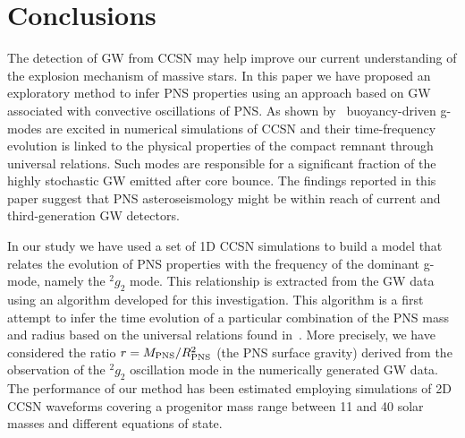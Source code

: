 \section{Conclusions}
\label{sec:conclusion}

The detection of GW from CCSN may help improve our current understanding of the explosion mechanism of massive stars.  
In this paper we have proposed an exploratory method to infer PNS properties using an approach based on GW associated with convective oscillations of PNS. As shown by~\cite{Torres:2019b} buoyancy-driven g-modes are excited in numerical simulations of CCSN and their time-frequency evolution is linked to the physical properties of the compact remnant through universal relations. Such modes are responsible for a significant fraction of the highly stochastic GW emitted after core bounce. The findings reported in this paper suggest that PNS asteroseismology might be within reach of current and third-generation GW detectors.

In our study we have used a set of 1D CCSN simulations to build a model that relates the  evolution of PNS properties with the frequency of the dominant g-mode, namely the $\mbox{}^2g_2$ mode. This relationship is extracted from the GW data using an algorithm developed for this investigation. This algorithm is  a first attempt to infer the time evolution of a particular combination of the PNS mass and radius based on the universal relations found in~\cite{Torres:2019b}. More precisely, we have considered the ratio $r=M_{\rm PNS}/R_{\rm PNS}^2$ (the PNS surface gravity) derived from the observation of the $\mbox{}^2g_2$ oscillation mode in the numerically generated GW data. The  performance of our method has been estimated employing  simulations of 2D CCSN waveforms covering a progenitor mass range between 11 and 40 solar masses and different equations of state. 

